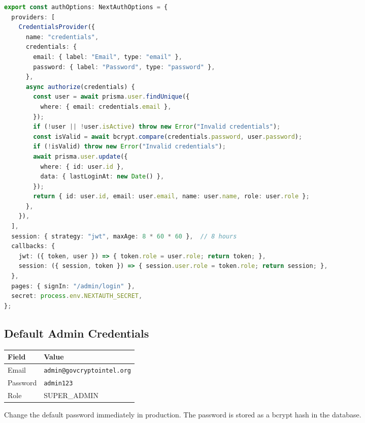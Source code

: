 \documentclass[12pt,a4paper]{article}
\begin{document}
\begin{lstlisting}[language=TypeScript,caption={src/lib/auth.ts}]
export const authOptions: NextAuthOptions = {
  providers: [
    CredentialsProvider({
      name: "credentials",
      credentials: {
        email: { label: "Email", type: "email" },
        password: { label: "Password", type: "password" },
      },
      async authorize(credentials) {
        const user = await prisma.user.findUnique({
          where: { email: credentials.email },
        });
        if (!user || !user.isActive) throw new Error("Invalid credentials");
        const isValid = await bcrypt.compare(credentials.password, user.password);
        if (!isValid) throw new Error("Invalid credentials");
        await prisma.user.update({
          where: { id: user.id },
          data: { lastLoginAt: new Date() },
        });
        return { id: user.id, email: user.email, name: user.name, role: user.role };
      },
    }),
  ],
  session: { strategy: "jwt", maxAge: 8 * 60 * 60 },  // 8 hours
  callbacks: {
    jwt: ({ token, user }) => { token.role = user.role; return token; },
    session: ({ session, token }) => { session.user.role = token.role; return session; },
  },
  pages: { signIn: "/admin/login" },
  secret: process.env.NEXTAUTH_SECRET,
};
\end{lstlisting}

\subsection{Default Admin Credentials}

\begin{center}
\begin{tabular}{ll}
\toprule
\textbf{Field} & \textbf{Value} \\
\midrule
Email & \texttt{admin@govcryptointel.org} \\
Password & \texttt{admin123} \\
Role & SUPER\_ADMIN \\
\bottomrule
\end{tabular}
\end{center}

\begin{warnbox}
Change the default password immediately in production. The password is stored as a bcrypt hash in the database.
\end{warnbox}

\newpage

\end{document}
